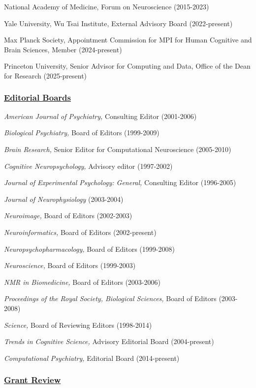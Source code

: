 \documentclass[10 pt]{article}
\begin{document}
National Academy of Medicine, Forum on Neuroscience (2015-2023)

Yale University, Wu Tsai Institute, External Advisory Board (2022-present)

Max Planck Society, Appointment Commission for MPI for Human Cognitive and Brain Sciences, Member (2024-present)

Princeton University, Senior Advisor for Computing and Data, Office of the Dean for Research (2025-present)


\subsubsection*{\underline{Editorial Boards}} \label{secEB}
    \smallskip

\textit{American Journal of Psychiatry,} Consulting Editor (2001-2006)

\textit{Biological Psychiatry,} Board of Editors (1999-2009)

\textit{Brain Research,} Senior Editor for Computational Neuroscience (2005-2010)

\textit{Cognitive Neuropsychology,} Advisory editor (1997-2002)

\textit{Journal of Experimental Psychology: General,} Consulting Editor (1996-2005)

\textit{Journal of Neurophysiology} (2003-2004)

\textit{Neuroimage,} Board of Editors (2002-2003)

\textit{Neuroinformatics,} Board of Editors (2002-present)

\textit{Neuropsychopharmacology,} Board of Editors (1999-2008)

\textit{Neuroscience,} Board of Editors (1999-2003)

\textit{NMR in Biomedicine,} Board of Editors (2003-2006)

\textit{Proceedings of the Royal Society, Biological Sciences,} Board of Editors (2003-2008)

\textit{Science,} Board of Reviewing Editors (1998-2014)

\textit{Trends in Cognitive Science,} Advisory Editorial Board (2004-present)

\textit{Computational Psychiatry,} Editorial Board (2014-present)


\subsubsection*{\underline{Grant Review}} \label{secGR}
    \smallskip
\end{document}
